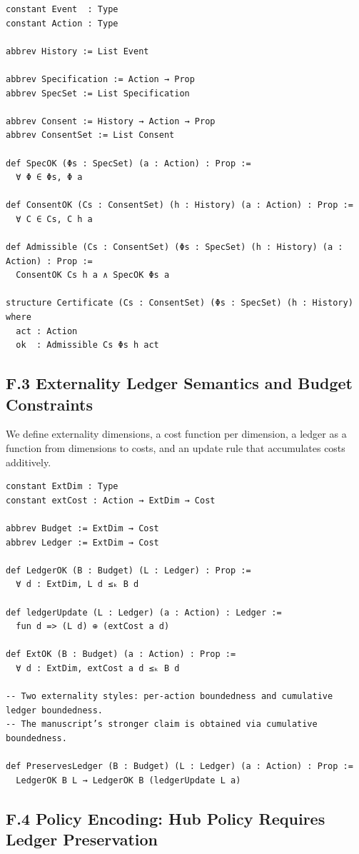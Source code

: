 \documentclass[11pt,oneside]{article}
\begin{document}
\begin{verbatim}
constant Event  : Type
constant Action : Type

abbrev History := List Event

abbrev Specification := Action → Prop
abbrev SpecSet := List Specification

abbrev Consent := History → Action → Prop
abbrev ConsentSet := List Consent

def SpecOK (Φs : SpecSet) (a : Action) : Prop :=
  ∀ Φ ∈ Φs, Φ a

def ConsentOK (Cs : ConsentSet) (h : History) (a : Action) : Prop :=
  ∀ C ∈ Cs, C h a

def Admissible (Cs : ConsentSet) (Φs : SpecSet) (h : History) (a : Action) : Prop :=
  ConsentOK Cs h a ∧ SpecOK Φs a

structure Certificate (Cs : ConsentSet) (Φs : SpecSet) (h : History) where
  act : Action
  ok  : Admissible Cs Φs h act
\end{verbatim}

\subsection{F.3 Externality Ledger Semantics and Budget Constraints}

We define externality dimensions, a cost function per dimension, a ledger as a function from dimensions to costs, and an update rule that accumulates costs additively.

\begin{verbatim}
constant ExtDim : Type
constant extCost : Action → ExtDim → Cost

abbrev Budget := ExtDim → Cost
abbrev Ledger := ExtDim → Cost

def LedgerOK (B : Budget) (L : Ledger) : Prop :=
  ∀ d : ExtDim, L d ≤ₖ B d

def ledgerUpdate (L : Ledger) (a : Action) : Ledger :=
  fun d => (L d) ⊕ (extCost a d)

def ExtOK (B : Budget) (a : Action) : Prop :=
  ∀ d : ExtDim, extCost a d ≤ₖ B d

-- Two externality styles: per-action boundedness and cumulative ledger boundedness.
-- The manuscript’s stronger claim is obtained via cumulative boundedness.

def PreservesLedger (B : Budget) (L : Ledger) (a : Action) : Prop :=
  LedgerOK B L → LedgerOK B (ledgerUpdate L a)
\end{verbatim}

\subsection{F.4 Policy Encoding: Hub Policy Requires Ledger Preservation}
\end{document}
